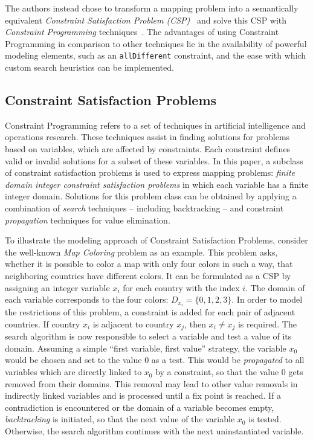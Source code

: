 \documentclass[conference]{IEEEtran}
\begin{document}
The authors instead chose to transform a mapping problem into a semantically equivalent \emph{Constraint Satisfaction Problem (CSP)}~\cite{Apt2003} and solve this CSP with \emph{Constraint Programming} techniques~\cite{Rossi2006}.
The advantages of using Constraint Programming in comparison to other techniques lie in the availability of powerful modeling elements, such as an \texttt{allDifferent} constraint, and the ease with which custom search heuristics can be implemented.

\subsection{Constraint Satisfaction Problems}
Constraint Programming refers to a set of techniques in artificial intelligence and operations research.
These techniques assist in finding solutions for problems based on variables, which are affected by constraints.
Each constraint defines valid or invalid solutions for a subset of these variables.
In this paper, a subclass of constraint satisfaction problems is used to express mapping problems:  \emph{finite domain integer constraint satisfaction problems} in which each variable has a finite integer domain.
Solutions for this problem class can be obtained by applying a combination of \emph{search} techniques -- including backtracking -- and constraint \emph{propagation} techniques for value elimination.

To illustrate the modeling approach of Constraint Satisfaction Problems, consider the well-known \emph{Map Coloring} problem as an example.
This problem asks, whether it is possible to color a map with only four colors in such a way, that neighboring countries have different colors.
It can be formulated as a CSP by assigning an integer variable $x_i$ for each country with the index $i$.
The domain of each variable corresponds to the four colors: $D_{x_i}=\{0,1,2,3\}$.
In order to model the restrictions of this problem, a constraint is added for each pair of adjacent countries.
If country $x_i$ is adjacent to country $x_j$, then $x_i \neq x_j$ is required.
The search algorithm is now responsible to select a variable and test a value of its domain.
Assuming a simple ``first variable, first value'' strategy, the variable $x_0$ would be chosen and set to the value $0$ as a test.
This would be \emph{propagated} to all variables which are directly linked to $x_0$ by a constraint, so that the value $0$ gets removed from their domains.
This removal may lead to other value removals in indirectly linked variables and is processed until a fix point is reached.
If a contradiction is encountered or the domain of a variable becomes empty, \emph{backtracking} is initiated, so that the next value of the variable $x_0$ is tested.
Otherwise, the search algorithm continues with the next uninstantiated variable.
\end{document}
